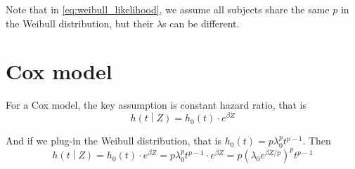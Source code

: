 \documentclass[a4paper,12pt]{article}
\begin{document}
Note that in \eqref{eq:weibull_likelihood}, we assume all subjects share the same $p$ in the Weibull distribution, but their $\lambda$s can be different. 



\section{Cox model}
\label{sec:cox-model}

For a Cox model, the key assumption is constant hazard ratio, that is
\[
  h\left(t\middle|Z\right) = h_0\left(t\right)\cdot e^{\beta Z}
\]

And if we plug-in the Weibull distribution, that is $h_0\left(t\right) = p\lambda_0^pt^{p - 1}$. Then
\[
  h\left(t\middle|Z\right)
  = h_0\left(t\right)\cdot e^{\beta Z}
  = p\lambda_0^pt^{p - 1} \cdot e^{\beta Z}
  = p \left(\lambda_0 e^{\beta Z / p}\right)^p t^{p - 1}
\]



\end{document}
